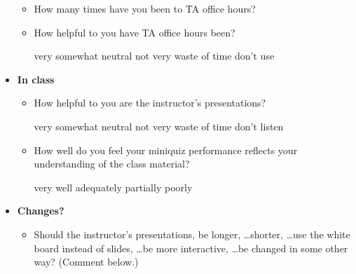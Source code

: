 \documentclass[handout]{mcs}
\begin{document}
\begin{itemize}
\begin{itemize}
\item How many times have you been to TA office hours?\hfill\examrule[0.7in]

\item How helpful to you have TA office hours been?
 
\begin{center}
very\hspace{0.3in} somewhat \hspace{0.3in} neutral\hspace{0.3in} not
very \hspace{0.3in} waste of time  \hspace{0.7in}don't use
\end{center}

\end{itemize}

\item \textbf{In class}

\begin{itemize}
\item How helpful to you are the instructor's presentations?

\begin{center}
very\hspace{0.3in} somewhat \hspace{0.3in} neutral\hspace{0.3in} not
very \hspace{0.3in} waste of time  \hspace{0.7in}don't listen
\end{center}

\item How well do you feel your miniquiz performance reflects your
  understanding of the class material?

\begin{center}
very well\hspace{0.3in} adequately\hspace{0.3in} partially\hspace{0.3in} poorly
\end{center}

\end{itemize}

\item \textbf{Changes?}
\begin{itemize}

\item Should the instructor's presentations, be longer, \dots shorter,
  \dots use the white board instead of slides, \dots be more
  interactive, \dots be changed in some other way?  (Comment below.)


\end{itemize}
\end{itemize}
\end{document}
